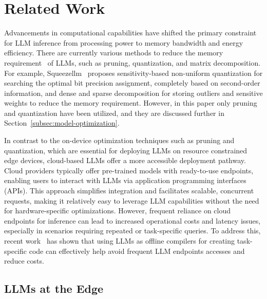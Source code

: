 \section{Related Work}
\label{sec:rw} 

Advancements in computational capabilities have shifted the primary constraint for LLM inference from processing power to memory bandwidth and energy efficiency. 
There are currently various methods to reduce the memory requirement~\cite{ojika2020addressing} of LLMs, such as pruning, quantization, and matrix decomposition. 
For example, Squeezellm~\cite{kim2023squeezellm} proposes sensitivity-based non-uniform quantization for searching the optimal bit precision assignment, completely based on second-order information, and dense and sparse decomposition for storing outliers and sensitive weights to reduce the memory requirement.
However, in this paper only pruning and quantization have been utilized, and they are discussed further in Section~\ref{subsec:model-optimization}.

In contrast to the on-device optimization techniques such as pruning and quantization, which are essential for deploying LLMs on resource constrained edge devices, cloud-based LLMs offer a more accessible deployment pathway. Cloud providers typically offer pre-trained models with ready-to-use endpoints, enabling users to interact with LLMs via application programming interfaces (APIs). This approach simplifies integration and facilitates scalable, concurrent requests, making it relatively easy to leverage LLM capabilities without the need for hardware-specific optimizations. 
However, frequent reliance on cloud endpoints for inference can lead to increased operational costs and latency issues, especially in scenarios requiring repeated or task-specific queries. To address this, recent work~\cite{dong2024creating} has shown that using LLMs as offline compilers for creating task-specific code can effectively help avoid frequent LLM endpoints accesses and reduce costs. 



\subsection{LLMs at the Edge}

